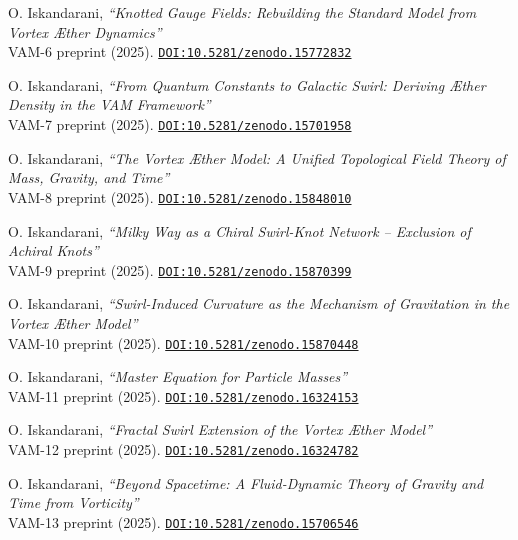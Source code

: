 \documentclass[twocolumn,aps,pre,floatfix,nofootinbib]{revtex4-2}
\begin{document}
\begin{thebibliography}{99}
    \label{VAM-6}
    O. Iskandarani,
    \emph{“Knotted Gauge Fields: Rebuilding the Standard Model from Vortex Æther Dynamics”}\\
    {\scriptsize VAM-6 preprint (2025).
    \href{https://doi.org/10.5281/zenodo.15772832}{\texttt{DOI:10.5281/zenodo.15772832}}}

    \label{VAM-7}
    O. Iskandarani,
    \emph{“From Quantum Constants to Galactic Swirl: Deriving Æther Density in the VAM Framework”}\\
    {\scriptsize VAM-7 preprint (2025).
    \href{https://doi.org/10.5281/zenodo.15701958}{\texttt{DOI:10.5281/zenodo.15701958}}}

    \label{VAM-8}
    O. Iskandarani,
    \emph{“The Vortex Æther Model: A Unified Topological Field Theory of Mass, Gravity, and Time”}\\
    {\scriptsize VAM-8 preprint (2025).
    \href{https://doi.org/10.5281/zenodo.15848010}{\texttt{DOI:10.5281/zenodo.15848010}}}

    \label{VAM-9}
    O. Iskandarani,
    \emph{“Milky Way as a Chiral Swirl-Knot Network – Exclusion of Achiral Knots”}\\
    {\scriptsize VAM-9 preprint (2025).
    \href{https://doi.org/10.5281/zenodo.15870399}{\texttt{DOI:10.5281/zenodo.15870399}}}

    \label{VAM-10}
    O. Iskandarani,
    \emph{“Swirl-Induced Curvature as the Mechanism of Gravitation in the Vortex Æther Model”}\\
    {\scriptsize VAM-10 preprint (2025).
    \href{https://doi.org/10.5281/zenodo.15870448}{\texttt{DOI:10.5281/zenodo.15870448}}}

    \label{VAM-11}
    O. Iskandarani,
    \emph{“Master Equation for Particle Masses”}\\
    {\scriptsize VAM-11 preprint (2025).
    \href{https://doi.org/10.5281/zenodo.16324153}{\texttt{DOI:10.5281/zenodo.16324153}}}

    \label{VAM-12}
    O. Iskandarani,
    \emph{“Fractal Swirl Extension of the Vortex Æther Model”}\\
    {\scriptsize VAM-12 preprint (2025).
    \href{https://doi.org/10.5281/zenodo.16324782}{\texttt{DOI:10.5281/zenodo.16324782}}}

    \label{VAM-13}
    O. Iskandarani,
    \emph{“Beyond Spacetime: A Fluid-Dynamic Theory of Gravity and Time from Vorticity”}\\
    {\scriptsize VAM-13 preprint (2025).
    \href{https://doi.org/10.5281/zenodo.15706546}{\texttt{DOI:10.5281/zenodo.15706546}}}


\end{thebibliography}
\end{document}
